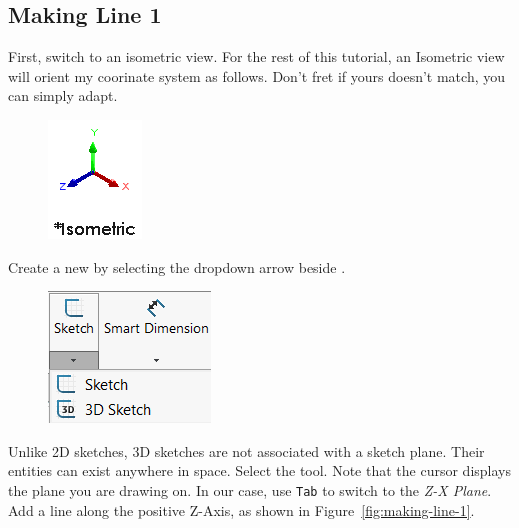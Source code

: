 \subsection{Making Line 1}

\label{sec:making_line_1}

First, switch to an isometric view. For the rest of this tutorial, an Isometric
view will orient my coorinate system as follows. Don't fret if yours doesn't
match, you can simply adapt.

\begin{figure}[H]
\begin{center}
\includegraphics{images/figures/Coordinate-System.png}
\end{center}
\end{figure}

Create a new  by selecting the dropdown arrow beside
.

\begin{figure}[H]
\begin{center}
\includegraphics{images/symbols/3D-Sketch-Button.png}
\end{center}
\end{figure}

Unlike 2D sketches, 3D sketches are not associated with a sketch plane. Their entities
can exist anywhere in space. Select the  tool. Note that the cursor displays the plane you are drawing
on. In our case, use \texttt{Tab} to
switch to the \emph{Z-X Plane}. Add a line along
the positive Z-Axis, as shown in Figure~\ref{fig:making-line-1}.

